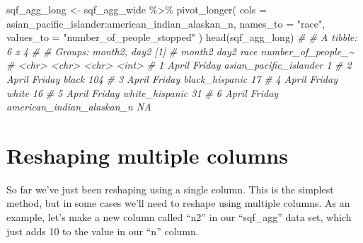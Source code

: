 \documentclass[
  a4paper,
]{krantz}
\makeatletter
\newenvironment{Shaded}{\begin{snugshade}}{\end{snugshade}}
\newcommand{\AttributeTok}[1]{\textcolor[rgb]{0.61,0.61,0.61}{#1}}
\newcommand{\CommentTok}[1]{\textcolor[rgb]{0.37,0.37,0.37}{\textit{#1}}}
\newcommand{\DecValTok}[1]{\textcolor[rgb]{0.06,0.06,0.06}{#1}}
\newcommand{\FunctionTok}[1]{\textcolor[rgb]{0,0,0}{#1}}
\newcommand{\NormalTok}[1]{#1}
\newcommand{\OtherTok}[1]{\textcolor[rgb]{0.37,0.37,0.37}{#1}}
\newcommand{\SpecialCharTok}[1]{\textcolor[rgb]{0,0,0}{#1}}
\newcommand{\StringTok}[1]{\textcolor[rgb]{0.5,0.5,0.5}{#1}}
\newenvironment{kframe}{%
\medskip{}
\setlength{\fboxsep}{.8em}
 \def\at@end@of@kframe{}%
 \ifinner\ifhmode%
  \def\at@end@of@kframe{\end{minipage}}%
  \begin{minipage}{\columnwidth}%
 \fi\fi%
 \def\FrameCommand##1{\hskip\@totalleftmargin \hskip-\fboxsep
 \colorbox{shadecolor}{##1}\hskip-\fboxsep
     \hskip-\linewidth \hskip-\@totalleftmargin \hskip\columnwidth}%
 \MakeFramed {\advance\hsize-\width
   \@totalleftmargin\z@ \linewidth\hsize
   \@setminipage}}%
 {\par\unskip\endMakeFramed%
 \at@end@of@kframe}
\renewenvironment{Shaded}{\begin{kframe}}{\end{kframe}}
\makeatother
\begin{document}
\begin{Shaded}
\begin{Highlighting}[]
\NormalTok{sqf\_agg\_long }\OtherTok{\textless{}{-}}\NormalTok{ sqf\_agg\_wide }\SpecialCharTok{\%\textgreater{}\%}
  \FunctionTok{pivot\_longer}\NormalTok{(}
    \AttributeTok{cols =}\NormalTok{ asian\_pacific\_islander}\SpecialCharTok{:}\NormalTok{american\_indian\_alaskan\_n,}
    \AttributeTok{names\_to =} \StringTok{"race"}\NormalTok{,}
    \AttributeTok{values\_to =} \StringTok{"number\_of\_people\_stopped"}
\NormalTok{  )}
\FunctionTok{head}\NormalTok{(sqf\_agg\_long)}
\CommentTok{\# \# A tibble: 6 x 4}
\CommentTok{\# \# Groups:   month2, day2 [1]}
\CommentTok{\#   month2 day2   race                      number\_of\_people\_\textasciitilde{}}
\CommentTok{\#   \textless{}chr\textgreater{}  \textless{}chr\textgreater{}  \textless{}chr\textgreater{}                                  \textless{}int\textgreater{}}
\CommentTok{\# 1 April  Friday asian\_pacific\_islander                     1}
\CommentTok{\# 2 April  Friday black                                    104}
\CommentTok{\# 3 April  Friday black\_hispanic                            17}
\CommentTok{\# 4 April  Friday white                                     16}
\CommentTok{\# 5 April  Friday white\_hispanic                            31}
\CommentTok{\# 6 April  Friday american\_indian\_alaskan\_n                 NA}
\end{Highlighting}
\end{Shaded}

\hypertarget{reshaping-multiple-columns}{%
\section{Reshaping multiple
columns}\label{reshaping-multiple-columns}}

So far we've just been reshaping using a single column. This
is the simplest method, but in some cases we'll need to
reshape using multiple columns. As an example, let's make a
new column called ``n2'' in our ``sqf\_agg'' data set, which
just adds 10 to the value in our ``n'' column.

\begin{Shaded}
\end{Shaded}
\end{document}
